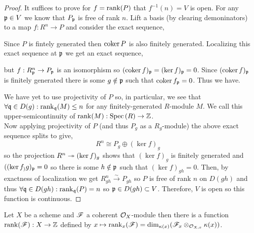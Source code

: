\documentclass[12pt]{article}
\begin{document}
\begin{proof}
It suffices to prove for $f = \mathrm{rank}(P)$ that $f^{-1}(n) = V$ is open. For any $\mathfrak{p} \in V$ we know that $P_{\mathfrak{p}}$ is free of rank $n$. Lift a basis (by clearing demoninators) to a map $f : R^n \to P$ and consider the exact sequence,
\begin{center}
\end{center}  
Since $P$ is fintely generated then $\operatorname{\mathrm{coker}}{P}$ is also finitely generated. Localizing this exact sequence at $\mathfrak{p}$ we get an exact sequence,
\begin{center}
\end{center}
but $f : R^n_{\mathfrak{p}} \to P_{\mathfrak{p}}$ is an isomorphism so $(\operatorname{\mathrm{coker}}{f})_{\mathfrak{p}} = (\ker{f})_{\mathfrak{p}} = 0$. Since $(\operatorname{\mathrm{coker}}{f})_{\mathfrak{p}}$ is finitely generated there is some $g \notin \mathfrak{p}$ such that $\operatorname{\mathrm{coker}}{f}_{\mathfrak{p}} = 0$. Thus we have.
\begin{center}
\end{center}
We have yet to use projectivity of $P$ so,
in particular, we see that $\forall \mathfrak{q} \in D(g) : \mathrm{rank}_{\mathfrak{q}}(M) \le n$ for any finitely-generated $R$-module $M$. We call this upper-semicontinuity of $\mathrm{rank}(M) : \mathrm{Spec}\left( R \right) \to \mathbb{Z}$.
\bigskip\\
Now applying projectivity of $P$ (and thus $P_g$ as a $R_g$-module) the above exact sequence splits to give,
\[ R^n \cong P_g \oplus (\ker{f})_g \]
so the projection $R^n \twoheadrightarrow (\ker{f})_g$ shows that $(\ker{f})_g$ is finitely generated and $((\ker{f}_)g)_{\mathfrak{p}} = 0$ so there is some $h \notin \mathfrak{p}$ such that $(\ker{f})_{gh} = 0$. Then, by exactness of localization we get $R_{gh}^n \xrightarrow{\sim} P_{gh}$ so $P$ is free of rank $n$ on $D(gh)$ and thus $\forall \mathfrak{q} \in D(gh) : \mathrm{rank}_{\mathfrak{q}}(P) = n$ so $\mathfrak{p} \in D(gh) \subset V$. Therefore, $V$ is open so this function is continuous.  
\end{proof}


\begin{definition}
Let $X$ be a scheme and $\mathscr{F}$ a coherent $\mathcal{O}_{X}$-module then there is a function $\mathrm{rank}(\mathscr{F}) : X \to \mathbb{Z}$ defined by $x \mapsto \mathrm{rank}_x(\mathscr{F}) = \dim_{\kappa(x)}(\mathscr{F}_x \otimes_{\mathcal{O}_{X, x}} \kappa(x))$. 
\end{definition}
\end{document}
